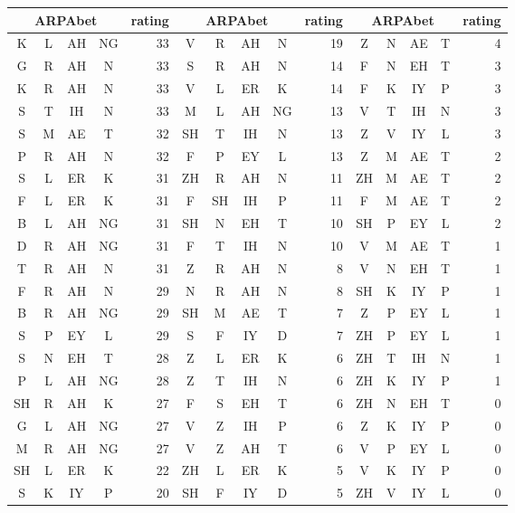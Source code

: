 \begin{center}
\begin{longtable}{c@{ } c@{ } c@{ } c r c@{ } c@{ } c@{ } c r | c@{ } c@{ } c@{ } c r} \toprule
\multicolumn{4}{c}{ARPAbet} & rating & \multicolumn{4}{c}{ARPAbet} & rating & \multicolumn{4}{c}{ARPAbet} & rating \\ 
\midrule
 K &  L & AH & NG & 33 &  V &  R & AH &  N & 19 &  Z & N & AE & T & 4 \\
 G &  R & AH &  N & 33 &  S &  R & AH &  N & 14 &  F & N & EH & T & 3 \\
 K &  R & AH &  N & 33 &  V &  L & ER &  K & 14 &  F & K & IY & P & 3 \\
 S &  T & IH &  N & 33 &  M &  L & AH & NG & 13 &  V & T & IH & N & 3 \\
 S &  M & AE &  T & 32 & SH &  T & IH &  N & 13 &  Z & V & IY & L & 3 \\
 P &  R & AH &  N & 32 &  F &  P & EY &  L & 13 &  Z & M & AE & T & 2 \\
 S &  L & ER &  K & 31 & ZH &  R & AH &  N & 11 & ZH & M & AE & T & 2 \\
 F &  L & ER &  K & 31 &  F & SH & IH &  P & 11 &  F & M & AE & T & 2 \\
 B &  L & AH & NG & 31 & SH &  N & EH &  T & 10 & SH & P & EY & L & 2 \\
 D &  R & AH & NG & 31 &  F &  T & IH &  N & 10 &  V & M & AE & T & 1 \\
 T &  R & AH &  N & 31 &  Z &  R & AH &  N &  8 &  V & N & EH & T & 1 \\
 F &  R & AH &  N & 29 &  N &  R & AH &  N &  8 & SH & K & IY & P & 1 \\
 B &  R & AH & NG & 29 & SH &  M & AE &  T &  7 &  Z & P & EY & L & 1 \\
 S &  P & EY &  L & 29 &  S &  F & IY &  D &  7 & ZH & P & EY & L & 1 \\
 S &  N & EH &  T & 28 &  Z &  L & ER &  K &  6 & ZH & T & IH & N & 1 \\
 P &  L & AH & NG & 28 &  Z &  T & IH &  N &  6 & ZH & K & IY & P & 1 \\
SH &  R & AH &  K & 27 &  F &  S & EH &  T &  6 & ZH & N & EH & T & 0 \\
 G &  L & AH & NG & 27 &  V &  Z & IH &  P &  6 &  Z & K & IY & P & 0 \\
 M &  R & AH & NG & 27 &  V &  Z & AH &  T &  6 &  V & P & EY & L & 0 \\
SH &  L & ER &  K & 22 & ZH &  L & ER &  K &  5 &  V & K & IY & P & 0 \\
S  &  K & IY &  P & 20 & SH &  F & IY &  D &  5 & ZH & V & IY & L & 0 \\
\bottomrule
\end{longtable}
\end{center}

